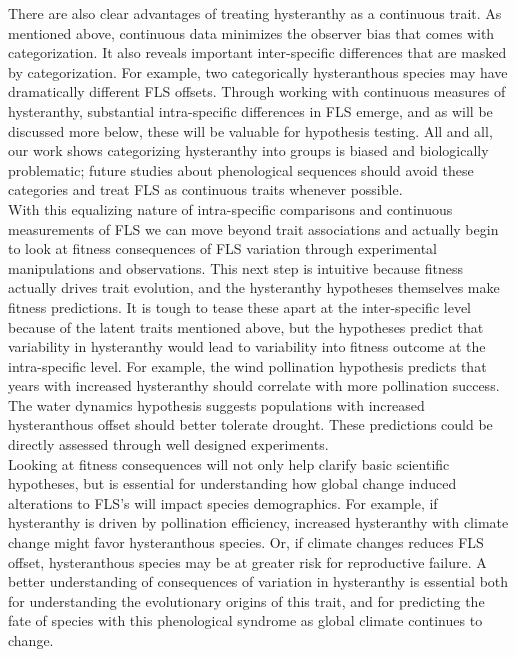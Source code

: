 \documentclass[12pt]{article}\usepackage[]{graphicx}\usepackage[]{color}
\begin{document}
\indent There are also clear advantages of treating hysteranthy as a continuous trait. As mentioned above, continuous data minimizes the observer bias that comes with categorization. It also reveals important inter-specific differences that are masked by categorization. For example, two categorically hysteranthous species may have dramatically different FLS offsets. Through working with continuous measures of hysteranthy, substantial intra-specific differences in FLS emerge, and as will be discussed more below, these will be valuable for hypothesis testing. All and all, our work shows categorizing hysteranthy into groups is biased and biologically problematic; future studies about phenological sequences should avoid these categories and treat FLS as continuous traits whenever possible.\\
\indent With this equalizing nature of intra-specific comparisons and continuous measurements of FLS we can move beyond trait associations and actually begin to look at fitness consequences of FLS variation through experimental manipulations and observations. This next step is intuitive because fitness actually drives trait evolution, and the hysteranthy hypotheses themselves make fitness predictions. It is tough to tease these apart at the inter-specific level because of the latent traits mentioned above, but the hypotheses predict that variability in hysteranthy would lead to variability into fitness outcome at the intra-specific level. 
For example, the wind pollination hypothesis predicts that years with increased hysteranthy should correlate with more pollination success. The water dynamics hypothesis suggests populations with increased hysteranthous offset should better tolerate drought. These predictions could be directly assessed through well designed experiments.\\
\indent Looking at fitness consequences will not only help clarify basic scientific hypotheses, but is essential for understanding how global change induced alterations to FLS's will impact species demographics. For example, if hysteranthy is driven by pollination efficiency, increased hysteranthy with climate change might favor hysteranthous species. Or, if climate changes reduces FLS offset, hysteranthous species may be at greater risk for reproductive failure. A better understanding of consequences of variation in hysteranthy is essential both for understanding the evolutionary origins of this trait, and for predicting the fate of species with this phenological syndrome as global climate continues to change.
\end{document}
